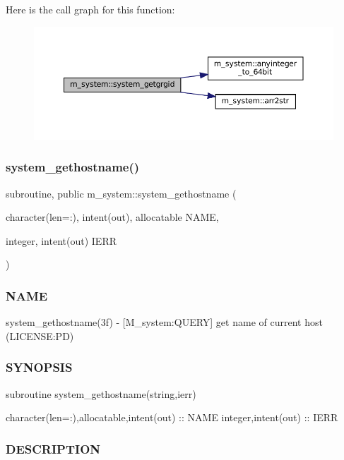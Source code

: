 Here is the call graph for this function\+:\nopagebreak
\begin{figure}[H]
\begin{center}
\leavevmode
\includegraphics[width=350pt]{namespacem__system_aec137429fbb8c848db4ecd914466d7e8_cgraph}
\end{center}
\end{figure}
\mbox{\label{namespacem__system_a96fab225737afb77ff1cbba9866f0d05}} 
\subsubsection{\texorpdfstring{system\+\_\+gethostname()}{system\_gethostname()}}
{\footnotesize\ttfamily subroutine, public m\+\_\+system\+::system\+\_\+gethostname (\begin{DoxyParamCaption}\item[{character(len=\+:), intent(out), allocatable}]{N\+A\+ME,  }\item[{integer, intent(out)}]{I\+E\+RR }\end{DoxyParamCaption})}



\subsubsection*{N\+A\+ME}

system\+\_\+gethostname(3f) -\/ \mbox{[}M\+\_\+system\+:Q\+U\+E\+RY\mbox{]} get name of current host (L\+I\+C\+E\+N\+SE\+:PD) \subsubsection*{S\+Y\+N\+O\+P\+S\+IS}

subroutine system\+\_\+gethostname(string,ierr)

character(len=\+:),allocatable,intent(out) \+:\+: N\+A\+ME integer,intent(out) \+:\+: I\+E\+RR \subsubsection*{D\+E\+S\+C\+R\+I\+P\+T\+I\+ON}

